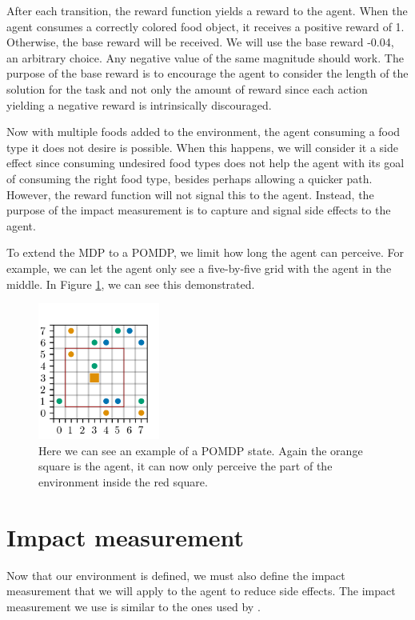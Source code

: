 \documentclass[12pt,A4]{report}
\theoremstyle{definition}
\begin{document}
After each transition, the reward function yields a reward to the agent. When the agent consumes a correctly colored food object, it receives a positive reward of 1. Otherwise, the base reward will be received. We will use the base reward -0.04, an arbitrary choice. Any negative value of the same magnitude should work. The purpose of the base reward is to encourage the agent to consider the length of the solution for the task and not only the amount of reward since each action yielding a negative reward is intrinsically discouraged. 

Now with multiple foods added to the environment, the agent consuming a food type it does not desire is possible. When this happens, we will consider it a side effect since consuming undesired food types does not help the agent with its goal of consuming the right food type, besides perhaps allowing a quicker path. However, the reward function will not signal this to the agent. Instead, the purpose of the impact measurement is to capture and signal side effects to the agent.


To extend the MDP to a POMDP, we limit how long the agent can perceive. For example, we can let the agent only see a five-by-five grid with the agent in the middle. In Figure \ref{fig:redline}, we can see this demonstrated. 

\begin{figure}[H]
  \centering
  \includegraphics[width=4cm]{"./figures/redline.png"}
  \caption{Here we can see an example of a POMDP state. Again the orange square is the agent, it can now only perceive the part of the environment inside the red square.}
  \label{fig:redline}
\end{figure}


\section{Impact measurement}
Now that our environment is defined, we must also define the impact measurement that we will apply to the agent to reduce side effects. The impact measurement we use is similar to the ones used by \citet{Turner19,Krakovna19,Krakovna20}.
\end{document}
